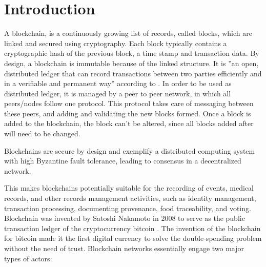 \chapter{Introduction}

A blockchain, is a continuously growing list of records, called blocks, which
are linked and secured using cryptography. Each block typically contains a
cryptographic hash of the previous block, a time stamp and transaction data. By
design, a blockchain is immutable because of the linked structure. It is ”an open,
distributed ledger that can record transactions between two parties efficiently
and in a verifiable and permanent way” according to \citep{blockchain-def}. In
order to be used as distributed ledger, it is managed by a peer to peer
network, in which all peers/nodes follow one protocol. This protocol takes care
of messaging between these peers, and adding and validating the new blocks
formed. Once a block is added to the blockchain, the block can't be altered,
since all blocks added after will need to be changed. 

Blockchains are secure by design and exemplify a distributed computing system
with high Byzantine fault tolerance, leading to consensus in a decentralized
network.

This makes blockchains potentially suitable for the recording of events,
medical records, and other records management activities, such as identity
management, transaction processing, documenting provenance, food traceability,
and voting. \citep{blockchain-wiki} Blockchain was invented by Satoshi
Nakamoto in 2008 to serve as the public transaction ledger of the
cryptocurrency bitcoin \citep{bitcoin}. The invention of the blockchain for
bitcoin made it the first digital currency to solve the double-spending
problem without the need of trust. Blockchain networks essentially engage two
major types of actors:

